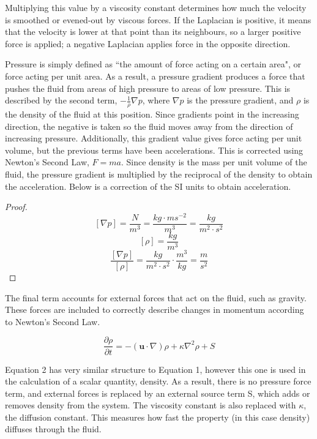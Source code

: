 \documentclass[12pt]{article}
\begin{document}
    Multiplying this value by a viscosity constant determines how much the velocity is smoothed or evened-out by viscous forces. If the Laplacian is positive, it means that the velocity is lower at that point than its neighbours, so a larger positive force is applied; a negative Laplacian applies force in the opposite direction.

    Pressure is simply defined as ``the amount of force acting on a certain area"\cite{bbcbitesize}, or force acting per unit area. As a result, a pressure gradient produces a force that pushes the fluid from areas of high pressure to areas of low pressure. This is described by the second term, $-\frac{1}{\rho}\nabla{p}$, where $\nabla{p}$ is the pressure gradient, and $\rho$ is the density of the fluid at this position. Since gradients point in the increasing direction, the negative is taken so the fluid moves away from the direction of increasing pressure. Additionally, this gradient value gives force acting per unit volume, but the previous terms have been accelerations. This is corrected using Newton's Second Law, $F = ma$. Since density is the mass per unit volume of the fluid, the pressure gradient is multiplied by the reciprocal of the density to obtain the acceleration. Below is a correction of the SI units to obtain acceleration.

    \begin{proof}
        $$\left[\nabla{p}\right] = \frac{N}{m^3} = \frac{kg \cdot ms^{-2}}{m^3} = \frac{kg}{m^2\cdot s^2}$$
        $$\left[\rho\right] = \frac{kg}{m^3}$$
        $$\frac{\left[\nabla{p}\right]}{\left[\rho\right]} = \frac{kg}{m^2 \cdot s^2} \cdot \frac{m^3}{kg} = \frac{m}{s^2}$$
    \end{proof}
    
    The final term accounts for external forces that act on the fluid, such as gravity. These forces are included to correctly describe changes in momentum according to Newton's Second Law.

    \begin{equation}
        \frac{\partial{\rho}}{\partial{t}} = -(\textbf{u}\cdot\nabla)\rho + \kappa\nabla^2 \rho + S
    \end{equation}

    Equation 2 has very similar structure to Equation 1, however this one is used in the calculation of a scalar quantity, density. As a result, there is no pressure force term, and external forces is replaced by an external source term S, which adds or removes density from the system. The viscosity constant is also replaced with $\kappa$, the diffusion constant. This measures how fast the property (in this case density) diffuses through the fluid.
\end{document}
